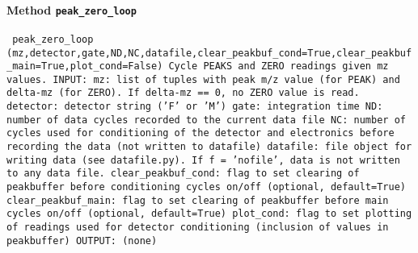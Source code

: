 \paragraph{Method \texttt{peak_zero_loop}}
\vspace{1ex}
\texttt{\newline
peak_zero_loop (mz,detector,gate,ND,NC,datafile,clear_peakbuf_cond=True,clear_peakbuf_main=True,plot_cond=False)\newline
\newline
Cycle PEAKS and ZERO readings given mz values.\newline
\newline
INPUT:\newline
mz: list of tuples with peak m/z value (for PEAK) and delta-mz (for ZERO). If delta-mz == 0, no ZERO value is read.\newline
detector: detector string ('F' or 'M')\newline
gate: integration time\newline
ND: number of data cycles recorded to the current data file\newline
NC: number of cycles used for conditioning of the detector and electronics before recording the data (not written to datafile)\newline
datafile: file object for writing data (see datafile.py). If f = 'nofile', data is not written to any data file.\newline
clear_peakbuf_cond: flag to set clearing of peakbuffer before conditioning cycles on/off (optional, default=True)\newline
clear_peakbuf_main: flag to set clearing of peakbuffer before main cycles on/off (optional, default=True)\newline
plot_cond: flag to set plotting of readings used for detector conditioning (inclusion of values in peakbuffer)\newline
\newline
OUTPUT:\newline
(none)\newline
\newline
}

